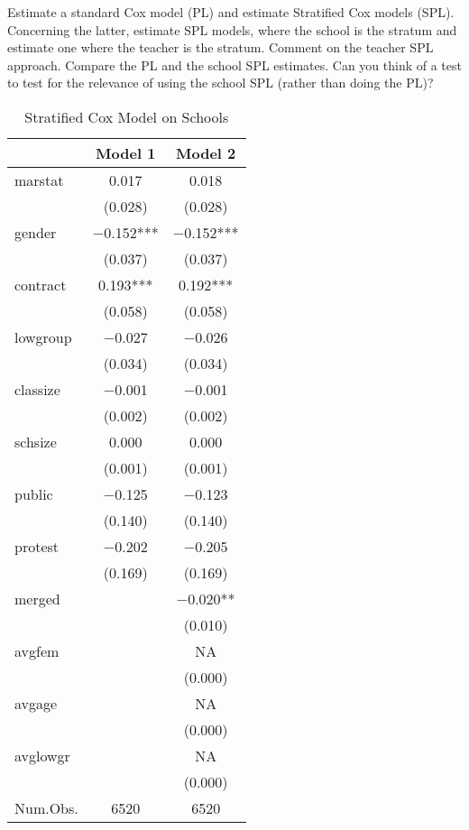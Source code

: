 \documentclass[
]{article}
\begin{document}
Estimate a standard Cox model (PL) and estimate Stratified Cox models
(SPL). Concerning the latter, estimate SPL models, where the school is
the stratum and estimate one where the teacher is the stratum. Comment
on the teacher SPL approach. Compare the PL and the school SPL
estimates. Can you think of a test to test for the relevance of using
the school SPL (rather than doing the PL)?

\begin{table}[!h]

\caption{\label{tab:unnamed-chunk-25}Stratified Cox Model on Schools}
\centering
\fontsize{8}{10}\selectfont
\begin{tabular}[t]{lcc}
\toprule
  & Model 1 & Model 2\\
\midrule
marstat & \num{0.017} & \num{0.018}\\
 & (\num{0.028}) & (\num{0.028})\\
gender & \num{-0.152}*** & \num{-0.152}***\\
 & (\num{0.037}) & (\num{0.037})\\
contract & \num{0.193}*** & \num{0.192}***\\
 & (\num{0.058}) & (\num{0.058})\\
lowgroup & \num{-0.027} & \num{-0.026}\\
 & (\num{0.034}) & (\num{0.034})\\
classize & \num{-0.001} & \num{-0.001}\\
 & (\num{0.002}) & (\num{0.002})\\
schsize & \num{0.000} & \num{0.000}\\
 & (\num{0.001}) & (\num{0.001})\\
public & \num{-0.125} & \num{-0.123}\\
 & (\num{0.140}) & (\num{0.140})\\
protest & \num{-0.202} & \num{-0.205}\\
 & (\num{0.169}) & (\num{0.169})\\
merged &  & \num{-0.020}**\\
 &  & (\num{0.010})\\
avgfem &  & \num{NA}\\
 &  & \vphantom{2} (\num{0.000})\\
avgage &  & \num{NA}\\
 &  & \vphantom{1} (\num{0.000})\\
avglowgr &  & \num{NA}\\
 &  & (\num{0.000})\\
\midrule
Num.Obs. & \num{6520} & \num{6520}\\

\end{tabular}
\end{table}
\end{document}
